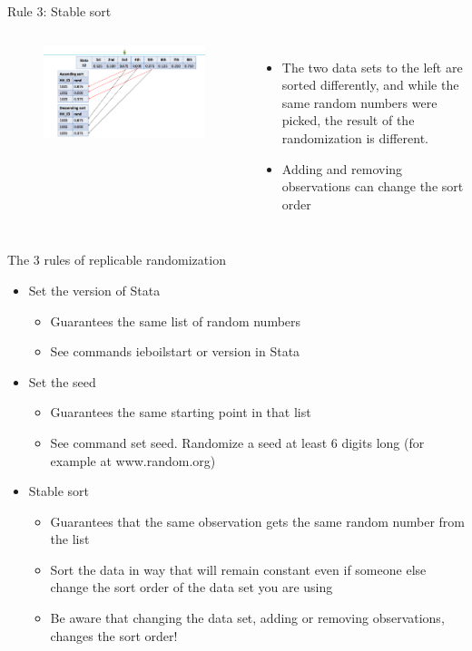 \documentclass[aspectratio=169]{beamer}
\begin{document}
\begin{frame}{Rule 3: Stable sort}	
\begin{columns}[c]
\begin{figure}
	\centering
	\includegraphics[width=\linewidth]{img/rule3}
\end{figure}
\begin{itemize}
	\item The two data sets to the left are sorted differently, and while the same random numbers were picked, the result of the randomization is different.
	\item Adding and removing observations can change the sort order
\end{itemize}
\end{columns}
\end{frame}


\begin{frame}{The 3 rules of replicable randomization}
\begin{itemize}
	\item Set the version of Stata
		\begin{itemize}
			\item Guarantees the same list of random numbers
			\item See commands ieboilstart or version in Stata
		\end{itemize}
	\item Set the seed 
		\begin{itemize}
			\item 	Guarantees the same starting point in that list
			\item See command set seed. Randomize a seed at least 6 digits long (for example at www.random.org)
		\end{itemize}
	\item Stable sort
		\begin{itemize}
			\item Guarantees that the same observation gets the same random number from the list
			\item Sort the data in way that will remain constant even if someone else change the sort order of the data set you are using
			\item Be aware that changing the data set, adding or removing observations, changes the sort order!
		\end{itemize}
\end{itemize}
\end{frame}
\end{document}
